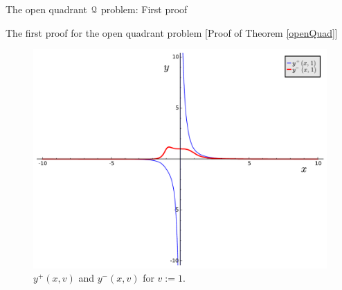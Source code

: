 \documentclass[11pt, a4paper, english, twoside, notitlepage, openright]{report}
\begin{document}
\begin{chapter}{The open quadrant $\mathcal{Q}$ problem: First proof}
\begin{section}{The first proof for the open quadrant problem} [Proof of Theorem \ref{openQuad}]
\begin{figure}[h]
\includegraphics[width=1\textwidth]{plots/ch1_07_sols_1.pdf}
\caption{$y^+(x,v)$ and $y^-(x,v)$ for $v:=1$.\label{fig:plotYs_2}}
\end{figure}


\end{section}
\end{chapter}
\end{document}
